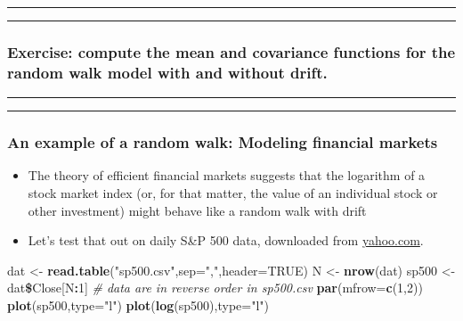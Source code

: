 \documentclass[]{article}
\newenvironment{Shaded}{\begin{snugshade}}{\end{snugshade}}
\newcommand{\KeywordTok}[1]{\textcolor[rgb]{0.13,0.29,0.53}{\textbf{#1}}}
\newcommand{\DataTypeTok}[1]{\textcolor[rgb]{0.13,0.29,0.53}{#1}}
\newcommand{\DecValTok}[1]{\textcolor[rgb]{0.00,0.00,0.81}{#1}}
\newcommand{\StringTok}[1]{\textcolor[rgb]{0.31,0.60,0.02}{#1}}
\newcommand{\CommentTok}[1]{\textcolor[rgb]{0.56,0.35,0.01}{\textit{#1}}}
\newcommand{\OtherTok}[1]{\textcolor[rgb]{0.56,0.35,0.01}{#1}}
\newcommand{\OperatorTok}[1]{\textcolor[rgb]{0.81,0.36,0.00}{\textbf{#1}}}
\newcommand{\NormalTok}[1]{#1}
\begin{document}
\begin{center}\rule{0.5\linewidth}{\linethickness}\end{center}

\begin{center}\rule{0.5\linewidth}{\linethickness}\end{center}

\subsubsection{Exercise: compute the mean and covariance functions for
the random walk model with and without
drift.}\label{exercise-compute-the-mean-and-covariance-functions-for-the-random-walk-model-with-and-without-drift.}

\begin{center}\rule{0.5\linewidth}{\linethickness}\end{center}

\begin{center}\rule{0.5\linewidth}{\linethickness}\end{center}

\subsubsection{An example of a random walk: Modeling financial
markets}\label{an-example-of-a-random-walk-modeling-financial-markets}

\begin{itemize}
\item
  The theory of efficient financial markets suggests that the logarithm
  of a stock market index (or, for that matter, the value of an
  individual stock or other investment) might behave like a random walk
  with drift
\item
  Let's test that out on daily S\&P 500 data, downloaded from
  \href{http://real-chart.finance.yahoo.com/table.csv?s=\%5EGSPC\&d=0\&e=15\&f=2016\&g=d\&a=0\&b=3\&c=1950\&ignore=.csv}{yahoo.com}.
\end{itemize}

\begin{Shaded}
\begin{Highlighting}[]
\NormalTok{dat <-}\StringTok{ }\KeywordTok{read.table}\NormalTok{(}\StringTok{"sp500.csv"}\NormalTok{,}\DataTypeTok{sep=}\StringTok{","}\NormalTok{,}\DataTypeTok{header=}\OtherTok{TRUE}\NormalTok{)}
\NormalTok{N <-}\StringTok{ }\KeywordTok{nrow}\NormalTok{(dat)}
\NormalTok{sp500 <-}\StringTok{ }\NormalTok{dat}\OperatorTok{\$}\NormalTok{Close[N}\OperatorTok{:}\DecValTok{1}\NormalTok{] }\CommentTok{# data are in reverse order in sp500.csv}
\KeywordTok{par}\NormalTok{(}\DataTypeTok{mfrow=}\KeywordTok{c}\NormalTok{(}\DecValTok{1}\NormalTok{,}\DecValTok{2}\NormalTok{))}
\KeywordTok{plot}\NormalTok{(sp500,}\DataTypeTok{type=}\StringTok{"l"}\NormalTok{)}
\KeywordTok{plot}\NormalTok{(}\KeywordTok{log}\NormalTok{(sp500),}\DataTypeTok{type=}\StringTok{"l"}\NormalTok{)}
\end{Highlighting}
\end{Shaded}
\end{document}
